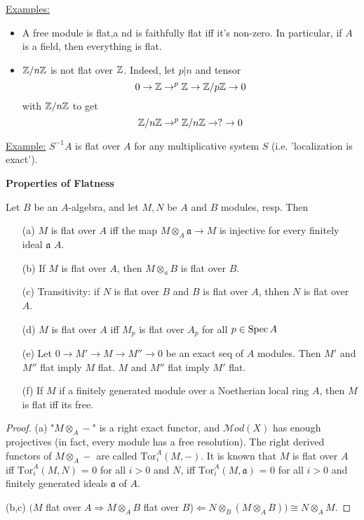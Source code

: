 \underline{Examples:}\begin{itemize}
 \item A free module is flat,a nd is
faithfully flat iff it's non-zero. In particular, if $A$ is a
field, then everything is flat.
 \item $\mathbb{Z}/n\mathbb{Z}$ is not flat over $\mathbb{Z}$.
Indeed, let $p|n$ and tensor \[ 0 \rightarrow \mathbb{Z} \rightarrow^p \mathbb{Z}
\rightarrow \mathbb{Z}/p\mathbb{Z} \rightarrow 0 \] with $\mathbb{Z}/n\mathbb{Z}$ to get \[ \mathbb{Z}/n\mathbb{Z}
\rightarrow^p \mathbb{Z}/n\mathbb{Z} \rightarrow ? \rightarrow 0 \] \end{itemize}

\underline{Example:} $S^{-1}A$ is flat over $A$ for any
multiplicative system $S$ (i.e. 'localization is exact').

\textbf{Properties of Flatness} \begin{theorem} Let $B$ be an
$A$-algebra, and let $M,N$ be $A$ and $B$ modules, resp. Then
\begin{itemize} \item[(a)]$M$ is flat over $A$ iff the map
$M\otimes_A \mathfrak{a} \rightarrow M$ is injective for every
finitely ideal $\mathfrak{a}$ $A$. \item[(b)] If $M$ is flat over
$A$, then $M\otimes_aB$ is flat over $B$. \item[(c)] Transitivity:
if $N$ is flat over $B$ and $B$ is flat over $A$, thhen $N$ is
flat over $A$. \item[(d)] $M$ is flat over $A$ iff $M_p$ is flat
over $A_p$ for all $p \in \text{\rm Spec\,}{A}$ \item[(e)]Let $0\rightarrow M'
\rightarrow M \rightarrow M'' \rightarrow 0$ be an exact seq of
$A$ modules. Then $M'$ and $M''$ flat imply $M$ flat. $M$ and
$M''$ flat imply $M'$ flat. \item[(f)] If $M$ if a finitely
generated module over a Noetherian local ring $A$, then $M$ is
flat iff its free. \end{itemize} \end{theorem} \begin{proof} (a)
"$M\otimes_A -$" is a right exact functor, and $\mathscr{M}od(X)$
has enough projectives (in fact, every module has a free
resolution). The right derived functors of $M\otimes_A-$ are
called $\text{Tor}_i^A(M,-)$. It is known that $M$ is flat over
$A$ iff $\text{Tor}_i^A(M,N)$ = 0 for all $i>0$ and $N$, iff
$\text{Tor}_i^A(M,\mathfrak{a})$ = 0 for all $i>0$ and finitely
generated ideals $\mathfrak{a}$ of $A$.

(b,c) $(M$ flat over $A \Rightarrow M \otimes_AB$ flat over
$B$)$\Leftarrow N\otimes_B(M\otimes_AB)) \cong N\otimes_AM$.


\end{proof}

